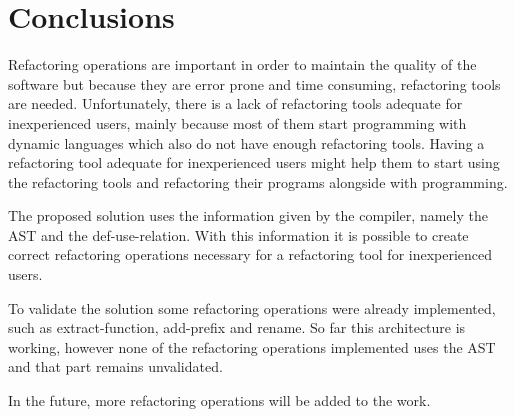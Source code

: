 
% 
% 

\section{Conclusions}


Refactoring operations are important in order to maintain the quality of the software but because they are error prone and time consuming, refactoring tools are needed.
Unfortunately, there is a lack of refactoring tools adequate for inexperienced users, mainly because most of them start programming with dynamic languages which also do not have enough refactoring tools.
Having a refactoring tool adequate for inexperienced users might help them to start using the refactoring tools and refactoring their programs alongside with programming.

The proposed solution uses the information given by the compiler, namely the AST and the def-use-relation. With this information it is possible to create correct refactoring operations necessary for a refactoring tool for inexperienced users.


To validate the solution some refactoring operations were already implemented, such as extract-function, add-prefix and rename. 
So far this architecture is working, however none of the refactoring operations implemented uses the AST and that part remains unvalidated.

In the future, more refactoring operations will be added to the work.







